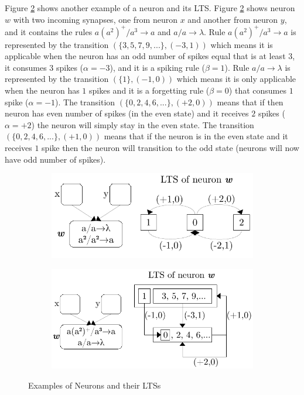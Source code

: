 \documentclass[runningheads,a4paper]{llncs}
\theoremstyle{definition}
\newcommand{\ra}{\rightarrow}
\begin{document}
Figure \ref{fig-lts-1b} shows another example of a neuron and its LTS. Figure \ref{fig-lts-1b} shows
neuron $w$ with two incoming synapses, one from neuron $x$ and another from neuron $y$, and it 
contains the rules $a(a^2)^+/a^3 \ra a$ and $a/a\ra \lambda$. Rule $a(a^2)^+/a^3 \ra a$ is 
represented by the transition $(\{3,5,7,9,...\},(-3,1))$ which means it is applicable when the 
neuron has an odd number of spikes equal that is at least $3$, it consumes $3$ spikes ($\alpha=-3$),
and it is a spiking rule ($\beta=1$). Rule $a/a \ra \lambda$ is represented by the transition 
$(\{1\},(-1,0))$ which means it is only applicable when the neuron has $1$ spikes and it is a
forgetting rule ($\beta=0$) that consumes $1$ spike ($\alpha=-1$). The transition $(\{0,2,4,6,...\},
(+2,0))$ means that if then neuron has even number of spikes (in the even state) and it receives
$2$ spikes ($\alpha=+2$) the neuron will simply stay in the even state. The transition $(\{0,2,4,6,
...\},(+1,0))$ means that if the neuron is in the even state and it receives $1$ spike then the
neuron will transition to the odd state (neurons will now have odd number of spikes). 

\begin{figure}[h]
   \centering
   \begin{subfigure}{\textwidth}
      \centering
      \includegraphics[scale=0.65]{fig-lts-1a.pdf}
      \caption{}
      \label{fig-lts-1a}
   \end{subfigure}
   \begin{subfigure}{\textwidth}
      \centering
      \includegraphics[scale=0.65]{fig-lts-1b.pdf}
      \caption{}
      \label{fig-lts-1b}
   \end{subfigure}
   \caption{Examples of Neurons and their LTSs}
   \label{fig-lts-1}
\end{figure}
\end{document}
